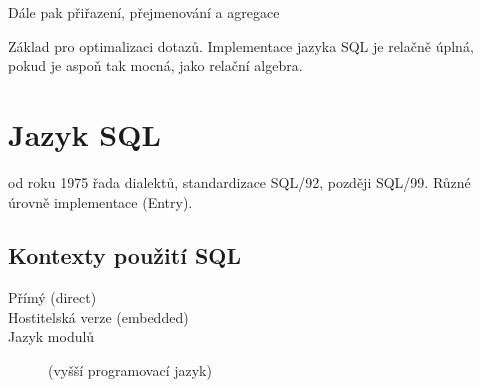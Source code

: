 \documentclass[a4paper, 11pt]{report}
\begin{document}
Dále pak přiřazení, přejmenování a agregace

Základ pro optimalizaci dotazů. Implementace jazyka SQL je relačně úplná, pokud je aspoň tak mocná, jako relační algebra.

\section{Jazyk SQL}

od roku 1975 řada dialektů, standardizace SQL/92, později SQL/99. Různé úrovně implementace (Entry).

\subsection{Kontexty použití SQL}
\begin{description}
	\item[Přímý (direct)]
	\item[Hostitelská verze (embedded)]
	\item[Jazyk modulů] (vyšší programovací jazyk)
\end{description}
\end{document}
